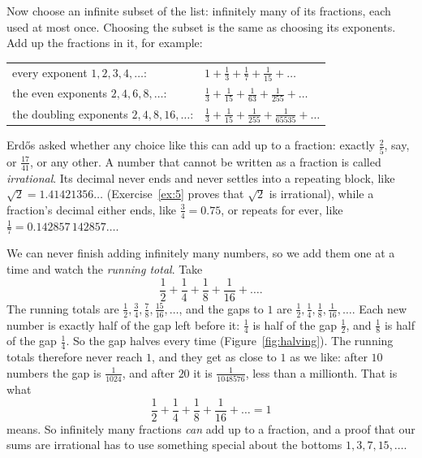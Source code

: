 \documentclass[10pt]{article}
\theoremstyle{plain}
\theoremstyle{definition}
\theoremstyle{remark}
\begin{document}
Now choose an infinite subset of the list: infinitely many of its fractions,
each used at most once. Choosing the subset is the same as choosing its
exponents. Add up the fractions in it, for example:
\begin{center}
\begin{tabular}{ll}
every exponent $1,2,3,4,\dots$: & $1+\tfrac13+\tfrac17+\tfrac1{15}+\dots$\\[3pt]
the even exponents $2,4,6,8,\dots$: & $\tfrac13+\tfrac1{15}+\tfrac1{63}+\tfrac1{255}+\dots$\\[3pt]
the doubling exponents $2,4,8,16,\dots$: & $\tfrac13+\tfrac1{15}+\tfrac1{255}+\tfrac1{65535}+\dots$
\end{tabular}
\end{center}
Erd\H{o}s asked whether any choice like this can add up to a fraction:
exactly $\tfrac25$, say, or $\tfrac{17}{41}$, or any other. A number that
cannot be written as a fraction is called \emph{irrational}. Its decimal never
ends and never settles into a repeating block, like $\sqrt2=1.41421356\dots$
(Exercise~\ref{ex:5} proves that $\sqrt2$ is irrational), while a fraction's decimal either ends, like $\tfrac34=0.75$, or repeats for
ever, like $\tfrac17=0.142857\,142857\dots$.

We can never finish adding infinitely many numbers, so we add them one at a
time and watch the \emph{running total}. Take
\[
 \frac12+\frac14+\frac18+\frac1{16}+\dots .
\]
The running totals are $\tfrac12,\tfrac34,\tfrac78,\tfrac{15}{16},\dots$, and
the gaps to $1$ are $\tfrac12,\tfrac14,\tfrac18,\tfrac1{16},\dots$. Each new
number is exactly half of the gap left before it: $\tfrac14$ is half of the
gap $\tfrac12$, and $\tfrac18$ is half of the gap $\tfrac14$. So the gap
halves every time (Figure~\ref{fig:halving}). The running totals therefore
never reach $1$, and they get as close to $1$ as we like: after $10$ numbers
the gap is $\tfrac1{1024}$, and after $20$ it is $\tfrac1{1048576}$, less than
a millionth. That is what
\[
 \frac12+\frac14+\frac18+\frac1{16}+\dots=1
\]
means. So infinitely many fractions \emph{can} add up to a fraction, and a
proof that our sums are irrational has to use something special about the
bottoms $1,3,7,15,\dots$.
\end{document}
